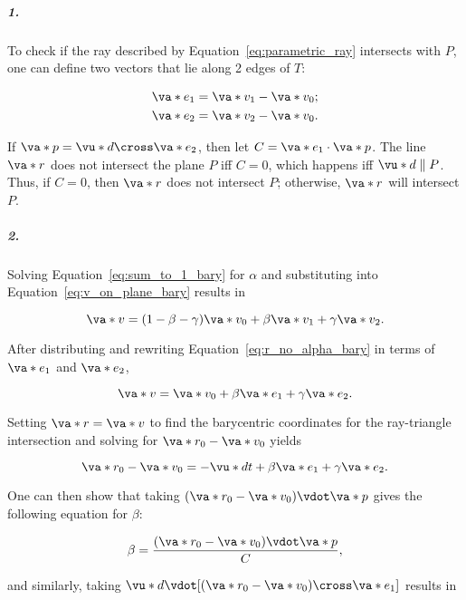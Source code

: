 \subparagraph{1.}
\par To check if the ray described by Equation~\ref{eq:parametric_ray} intersects with $P$, one can define two vectors that lie along 2 edges of $T$:

\begin{align}
  \va*{e_1} &= \va*{v_1} - \va*{v_0} \label{eq:e_1_bary};\\
  \va*{e_2} &= \va*{v_2} - \va*{v_0} \label{eq:e_2_bary}.
\end{align}

\noindent If $\va*{p} = \vu*{d} \cross \va*{e_2}$, then let $C = \va*{e_1} \cdot \va*{p}$. The line $\va*{r}$ does not intersect the plane $P$ iff $C = 0$, which happens iff $\vu*{d} \parallel P$. Thus, if $C = 0$, then $\va*{r}$ does not intersect $P$; otherwise, $\va*{r}$ will intersect $P$.

\subparagraph{2.}
Solving Equation~\ref{eq:sum_to_1_bary} for $\alpha$ and substituting into Equation~\ref{eq:v_on_plane_bary} results in

\begin{equation}
 \va*{v} = (1 - \beta - \gamma)\va*{v_0} + \beta\va*{v_1} + \gamma\va*{v_2}.
 \label{eq:r_no_alpha_bary}
\end{equation}

\noindent After distributing and rewriting Equation~\ref{eq:r_no_alpha_bary} in terms of $\va*{e_1}$ and $\va*{e_2}$, 

\begin{equation}
  \va*{v} = \va*{v_0} + \beta \va*{e_1} + \gamma \va*{e_2}.
  \label{eq:r_no_alpha_bary_simp}
\end{equation}

\noindent Setting $\va*{r} = \va*{v}$ to find the barycentric coordinates for the ray-triangle intersection and solving for $\va*{r_0} - \va*{v_0}$ yields

\begin{equation}
  \va*{r_0} - \va*{v_0} = -\vu*{d}t + \beta \va*{e_1} + \gamma \va*{e_2}.
\end{equation}

\noindent One can then show that taking $(\va*{r_0} - \va*{v_0}) \vdot \va*{p}$ gives the following equation for $\beta$:

\begin{equation}
  \beta = \frac{(\va*{r_0} - \va*{v_0}) \vdot \va*{p}}{C},
  \label{eq:beta_bary}
\end{equation}

\noindent and similarly, taking $\vu*{d} \vdot [(\va*{r_0} - \va*{v_0}) \cross \va*{e_1}]$ results in


